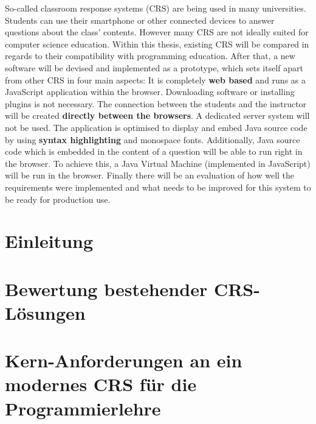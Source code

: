 \documentclass[draft=false
              ,paper=a4
              ,twoside=false
              ,fontsize=11pt
              ,headsepline
              ,BCOR=10mm
              ]{scrbook}
\begin{document}
{So-called classroom response systems (CRS) are being used in many universities. Students can use their smartphone or other connected devices to answer questions about the class' contents. However many CRS are not ideally suited for computer science education. Within this thesis, existing CRS will be compared in regards to their compatibility with programming education. After that, a new software will be devised and implemented as a prototype, which sets itself apart from other CRS in four main aspects:\newline
It is completely \textbf{web based} and runs as a JavaScript application within the browser. Downloading software or installing plugins is not necessary.\newline
The connection between the students and the instructor will be created \textbf{directly between the browsers}. A dedicated server system will not be used.\newline
The application is optimised to display and embed Java source code by using \textbf{syntax highlighting} and monospace fonts.\newline
Additionally, Java source code which is embedded in the content of a question will be able to run right in the browser. To achieve this, a Java Virtual Machine (implemented in JavaScript) will be run in the browser.\newline
Finally there will be an evaluation of how well the requirements were implemented and what needs to be improved for this system to be ready for production use.}
\newpage
\singlespacing

\setcounter{tocdepth}{3}
\tableofcontents
\newpage
\listoffigures
\newpage
\lstlistoflistings

\mainmatter
\onehalfspacing

\chapter{Einleitung}

\label{chap:einleitung}
%
\chapter{Bewertung bestehender CRS-Lösungen}
\label{chap:bewertung}

%
\chapter{Kern-Anforderungen an ein modernes CRS für die Programmierlehre}
\label{chap:anforderungen}

%
\end{document}
